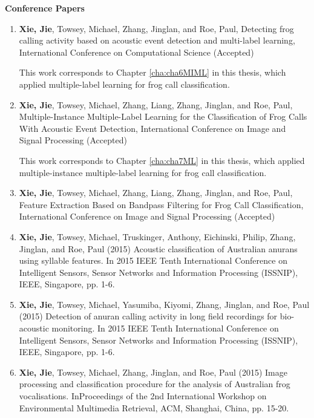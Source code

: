 { \textbf{Conference Papers}}
\begin{enumerate} 

\item \textbf{Xie, Jie}, Towsey, Michael, Zhang, Jinglan, and Roe, Paul, Detecting frog calling activity based on acoustic event detection and multi-label learning, International Conference on Computational Science (Accepted)
 
This work corresponds to Chapter \ref{cha:cha6MIML} in this thesis, which applied multiple-label learning for frog call classification. 
 
 
\item \textbf{Xie, Jie}, Towsey, Michael,  Zhang, Liang, Zhang, Jinglan, and Roe, Paul, Multiple-Instance Multiple-Label Learning for the Classification of Frog Calls With Acoustic Event Detection,  International Conference on Image and Signal Processing (Accepted)
 
This work corresponds to Chapter \ref{cha:cha7ML} in this thesis, which applied multiple-instance multiple-label learning for frog call classification. 
 
 
 
 
\item \textbf{Xie, Jie}, Towsey, Michael, Zhang, Liang, Zhang, Jinglan, and Roe, Paul, Feature Extraction Based on Bandpass Filtering for Frog Call Classification, International Conference on Image and Signal Processing (Accepted)



\item	\textbf{Xie, Jie}, Towsey, Michael, Truskinger, Anthony, Eichinski, Philip, Zhang, Jinglan, and Roe, Paul (2015) Acoustic classification of Australian anurans using syllable features. In 2015 IEEE Tenth International Conference on Intelligent Sensors, Sensor Networks and Information Processing (ISSNIP), IEEE, Singapore, pp. 1-6.

\item	\textbf{Xie, Jie}, Towsey, Michael, Yasumiba, Kiyomi, Zhang, Jinglan, and Roe, Paul (2015) Detection of anuran calling activity in long field recordings for bio-acoustic monitoring. In 2015 IEEE Tenth International Conference on Intelligent Sensors, Sensor Networks and Information Processing (ISSNIP), IEEE, Singapore, pp. 1-6.



\item	\textbf{Xie, Jie}, Towsey, Michael, Zhang, Jinglan, and Roe, Paul (2015) Image processing and classification procedure for the analysis of Australian frog vocalisations. InProceedings of the 2nd International Workshop on Environmental Multimedia Retrieval, ACM, Shanghai, China, pp. 15-20.



\end{enumerate}
